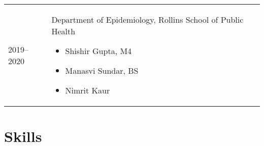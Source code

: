 \documentclass[10pt,a4paper,]{article}
\begin{document}
\begin{longtable}{@{\extracolsep{\fill}}ll}
2019--2020 & \parbox[t]{0.85\textwidth}{%
\textbf{}\hfill{\footnotesize }\newline
  Department of Epidemiology, Rollins School of Public Health\par%
  \vspace{0.1cm}\begin{minipage}{0.7\textwidth}%
\begin{itemize}%
\item Shishir Gupta, M4%
\item Manasvi Sundar, BS%
\item Nimrit Kaur%
\end{itemize}%
\end{minipage}%
\vspace{\parsep}}\\
\end{longtable}

\hypertarget{skills}{%
\section{Skills}\label{skills}}
\end{document}
